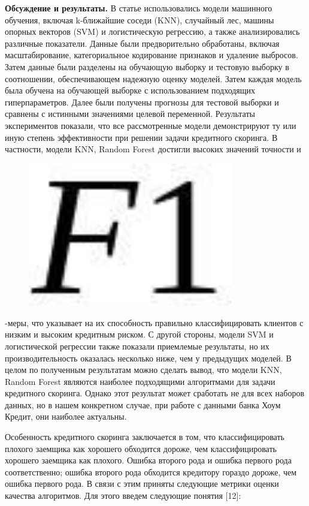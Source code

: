 {\bfseries Обсуждение и результаты.} В статье использовались модели
машинного обучения, включая k-ближайшие соседи (KNN), случайный лес,
машины опорных векторов (SVM) и логистическую регрессию, а также
анализировались различные показатели. Данные были предворительно
обработаны, включая масштабирование, категориальное кодирование
признаков и удаление выбросов. Затем данные были разделены на обучающую
выборку и тестовую выборку в соотношении, обеспечивающем надежную оценку
моделей. Затем каждая модель была обучена на обучающей выборке с
использованием подходящих гиперпараметров. Далее были получены прогнозы
для тестовой выборки и сравнены с истинными значениями целевой
переменной. Результаты экспериментов показали, что все рассмотренные
модели демонстрируют ту или иную степень эффективности при решении
задачи кредитного скоринга. В частности, модели KNN, Random Forest
достигли высоких значений точности и
\begin{figure}[H]
	\centering
	\includegraphics[width=0.8\textwidth]{assets/115}
	\caption*{}
\end{figure}-меры, что указывает на их
способность правильно классифицировать клиентов с низким и высоким
кредитным риском. С другой стороны, модели SVM и логистической регрессии
также показали приемлемые результаты, но их производительность оказалась
несколько ниже, чем у предыдущих моделей. В целом по полученным
результатам можно сделать вывод, что модели KNN, Random Forest являются
наиболее подходящими алгоритмами для задачи кредитного скоринга. Однако
этот результат может сработать не для всех наборов данных, но в нашем
конкретном случае, при работе с данными банка Хоум Кредит, они наиболее
актуальны.

Особенность кредитного скоринга заключается в том, что классифицировать
плохого заемщика как хорошего обходится дороже, чем классифицировать
хорошего заемщика как плохого. Ошибка второго рода и ошибка первого рода
соответственно; ошибка второго рода обходится кредитору гораздо дороже,
чем ошибка первого рода. В связи с этим приняты следующие метрики оценки
качества алгоритмов. Для этого введем следующие понятия {[}12{]}:

